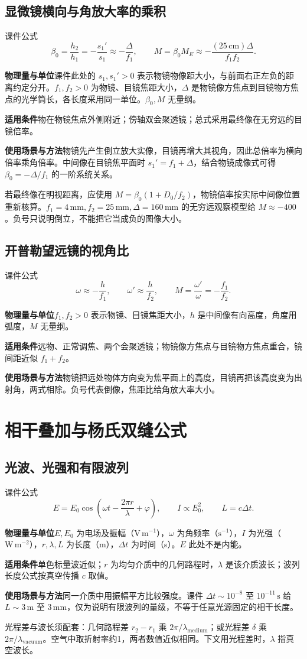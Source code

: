 \documentclass[UTF8,fontset=none,zihao=-4,a4paper]{ctexart}
\newcommand{\chapterpage}[1]{\clearpage\section{#1}}
\newcommand{\unit}[1]{\,\mathrm{#1}}
\newcommand{\explain}[3]{\par\noindent\textbf{物理量与单位}\quad #1\par
\noindent\textbf{适用条件}\quad #2\par
\noindent\textbf{使用场景与方法}\quad #3\par}
\begin{document}
\subsection{显微镜横向与角放大率的乘积}
\begin{infobox}[breakable=false]{课件公式}
\[
 \beta_0=\frac{h_2}{h_1}=-\frac{s_1'}{s_1}\approx-\frac\Delta{f_1},
 \qquad M=\beta_0M_E\approx-\frac{(25\unit{cm})\Delta}{f_1f_2}.
\]
\end{infobox}
\explain{课件此处的 $s_1,s_1'>0$ 表示物镜物像距大小，与前面右正左负的距离约定分开。$f_1,f_2>0$ 为物镜、目镜焦距大小，$\Delta$ 是物镜像方焦点到目镜物方焦点的光学筒长，各长度采用同一单位。$\beta_0,M$ 无量纲。}{物在物镜焦点外侧附近；傍轴双会聚透镜；总式采用最终像在无穷远的目镜倍率。}{物镜先产生倒立放大实像，目镜再增大其视角，因此总倍率为横向倍率乘角倍率。中间像在目镜焦平面时 $s_1'=f_1+\Delta$，结合物镜成像式可得 $\beta_0=-\Delta/f_1$ 的一阶系统关系。}
若最终像在明视距离，应使用 $M=\beta_0(1+D_0/f_2)$，物镜倍率按实际中间像位置重新核算。$f_1=4\unit{mm},f_2=25\unit{mm},\Delta=160\unit{mm}$ 的无穷远观察模型给 $M\approx-400$。负号只说明倒立，不能把它当成负的图像大小。

\subsection{开普勒望远镜的视角比}
\begin{infobox}[breakable=false]{课件公式}
\[
 \omega\approx-\frac h{f_1},\qquad \omega'\approx\frac h{f_2},
 \qquad M=\frac{\omega'}\omega=-\frac{f_1}{f_2}.
\]
\end{infobox}
\explain{$f_1,f_2>0$ 表示物镜、目镜焦距大小，$h$ 是中间像有向高度，角度用弧度，$M$ 无量纲。}{远物、正常调焦、两个会聚透镜；物镜像方焦点与目镜物方焦点重合，镜间距近似 $f_1+f_2$。}{物镜把远处物体方向变为焦平面上的高度，目镜再把该高度变为出射角，两式相除。负号代表倒像，焦距比给角放大率大小。}

\chapterpage{相干叠加与杨氏双缝公式}
\subsection{光波、光强和有限波列}
\begin{infobox}[breakable=false]{课件公式}
\[
 E=E_0\cos\left(\omega t-\frac{2\pi r}{\lambda}+\varphi\right),
 \qquad I\propto E_0^2,\qquad L=c\Delta t.
\]
\end{infobox}
\explain{$E,E_0$ 为电场及振幅（$\mathrm{V\,m^{-1}}$），$\omega$ 为角频率（$\mathrm{s^{-1}}$），$I$ 为光强（$\mathrm{W\,m^{-2}}$），$r,\lambda,L$ 为长度（m），$\Delta t$ 为时间（s）。$E$ 此处不是内能。}{单色标量波近似；$r$ 为均匀介质中的几何路程时，$\lambda$ 是该介质波长；波列长度公式按真空传播 $c$ 取值。}{同一介质中用振幅平方比较强度。课件 $\Delta t\sim10^{-8}$ 至 $10^{-11}\unit s$ 给 $L\sim3\unit m$ 至 $3\unit{mm}$，仅为说明有限波列的量级，不等于任意光源固定的相干长度。}
光程差与波长须配套：几何路程差 $r_2-r_1$ 乘 $2\pi/\lambda_{\mathrm{medium}}$；或光程差 $\delta$ 乘 $2\pi/\lambda_{\mathrm{vacuum}}$。空气中取折射率约1，两者数值近似相同。下文用光程差时，$\lambda$ 指真空波长。
\end{document}
